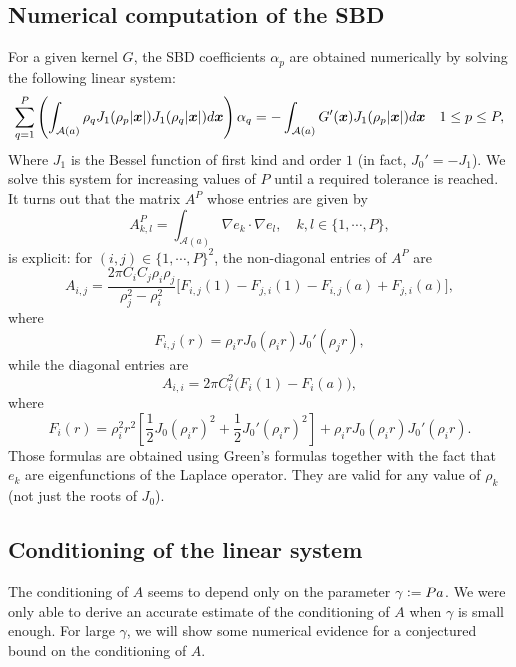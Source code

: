\documentclass[smallextended]{svjour3}
\begin{document}
																		
\subsection{Numerical computation of the SBD}
\label{sub:Chol}
																		
For a given kernel $G$, the SBD coefficients $\alpha_p$ are obtained numerically by solving the following linear system: 
\begin{equation}
	\sum_{q = 1}^P \left(\int_{\mathcal{A}(a)} \rho_ q J_1(\rho_p|\boldsymbol{x}|) J_1(\rho_q|\boldsymbol{x}|) d\boldsymbol{x}\right) \alpha_q = -\int_{\mathcal{A}(a)} G'(\boldsymbol{x}) J_1(\rho_p|\boldsymbol{x}|)d\boldsymbol{x} \quad 1\leq p \leq P,
	\label{LinearSystem}
\end{equation}
Where $J_1$ is the Bessel function of first kind and order $1$ (in fact, $J_0' = - J_1$). We solve this system for increasing values of $P$ until a required tolerance is reached. It turns out that the matrix $A^P$ whose entries are given by
\[ A^P_{k,l} = \int_{\mathcal{A}(a)} \!\!\!\!\!\!\!\! \nabla e_k \cdot \nabla e_l,\quad k,l \in \{1,\cdots,P\},\]
is explicit: for $(i,j) \in \{1,\cdots,P\}^2$, the non-diagonal entries of $A^P$ are
\begin{equation*}
	A_{i,j} = \frac{2\pi C_i C_j \rho_i \rho_j}{\rho_j^2 - \rho_i^2}\bigg[F_{i,j}(1) - F_{j,i}(1) - F_{i,j}(a) + F_{j,i}(a)\bigg],
\end{equation*}
where 
\[	 F_{i,j}(r) =  \rho_i r J_0(\rho_i r)J_0'(\rho_j r),\]
while the diagonal entries are
\begin{equation*}
	A_{i,i} = 2\pi C_i^2 \big(F_i(1) - F_i(a)\big),
\end{equation*}
where 
\[F_i(r) = \rho_i^2r^2\left[\dfrac{1}{2}J_0(\rho_ir)^2 + \frac{1}{2}J_0'(\rho_ir)^2\right] + \rho_irJ_0(\rho_i r)J_0'(\rho_ir).\]
Those formulas are obtained using Green's formulas together with the fact that $e_k$ are eigenfunctions of the Laplace operator. They are valid for any value of $\rho_k$ (not just the roots of $J_0$).
																		
\subsection{Conditioning of the linear system}
\newcommand{\Pa}{\gamma}
\newcommand{\Pastar}{\Pa^*}
The conditioning of $A$ seems to depend only on the parameter $\Pa \isdef Pa$. We were only able to derive an accurate estimate of the conditioning of $A$ when $\Pa$ is small enough. For large $\Pa$, we will show some numerical evidence for a conjectured bound on the conditioning of $A$.
\end{document}
